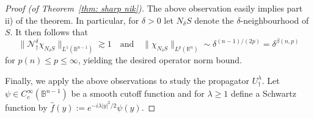 \documentclass[reqno]{amsart}
\numberwithin{equation}{section}
\newcommand{\B}{\mathbb{B}}
\newcommand{\R}{\mathbb{R}}
\newcommand{\cN}{\mathcal{N}}
\theoremstyle{plain}
\theoremstyle{definition}
\begin{document}
\begin{proof}[Proof (of Theorem~\ref{thm: sharp nik})]
The above observation easily implies part ii) of the theorem. In particular, for $\delta > 0$ let $N_{\delta} S$ denote the $\delta$-neighbourhood of $S$. It then follows that 
\begin{equation*}
    \|\cN_{\dagger}^{\delta}\chi_{N_{\delta} S}\|_{L^1(\B^{n-1})} \gtrsim 1 \quad \textrm{and} \quad \|\chi_{N_{\delta} S}\|_{L^p(\R^n)} \sim \delta^{(n-1)/(2p)} = \delta^{\beta(n, p)}
\end{equation*}
for $p(n) \leq p \leq \infty$, yielding the desired operator norm bound.

Finally, we apply the above observations to study the propagator $U_{\dagger}^{\lambda}$. Let $\psi \in C^{\infty}_c(\B^{n-1})$ be a smooth cutoff function and for $\lambda \geq 1$ define a Schwartz function by $\hat{f}(y) := e^{-i\lambda |y|^2/2} \psi(y)$. 


\end{proof}
\end{document}

